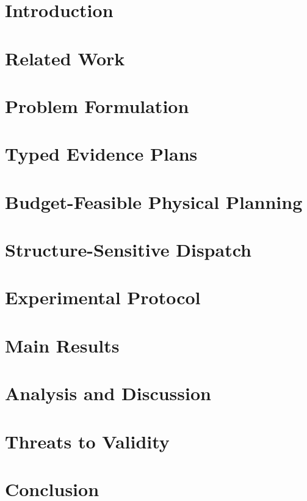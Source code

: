 \documentclass[journal]{IEEEtran}
\begin{document}
\section{Introduction}\label{sec:intro}


\section{Related Work}\label{sec:related}


\section{Problem Formulation}\label{sec:problem}


\section{Typed Evidence Plans}\label{sec:algebra}


\section{Budget-Feasible Physical Planning}\label{sec:optimizer}


\section{Structure-Sensitive Dispatch}\label{sec:dispatch}


\section{Experimental Protocol}\label{sec:protocol}


\section{Main Results}\label{sec:results}


\section{Analysis and Discussion}\label{sec:analysis}


\section{Threats to Validity}\label{sec:threats}


\section{Conclusion}\label{sec:conclusion}




\end{document}
